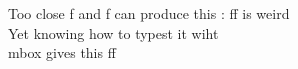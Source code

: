 \documentclass{article}
\begin{document}
\Large Too close f and f can produce this : ff is weird\\
Yet knowing how to typest it wiht \\mbox{} gives this f\mbox{}f
\end{document}
